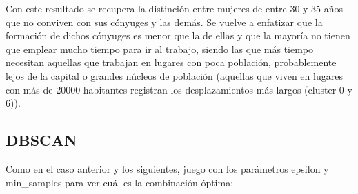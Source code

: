 Con este resultado se recupera la distinción entre mujeres de entre 30 y 35 años que no conviven con sus cónyuges y las demás. Se vuelve a enfatizar que la formación de dichos cónyuges es menor que la de ellas y que la mayoría no tienen que emplear mucho tiempo para ir al trabajo, siendo las que más tiempo necesitan aquellas que trabajan en lugares con poca población, probablemente lejos de la capital o grandes núcleos de población (aquellas que viven en lugares con más de 20000 habitantes registran los desplazamientos más largos (cluster 0 y 6)).

\newpage

\subsection{DBSCAN}

Como en el caso anterior y los siguientes, juego con los parámetros epsilon y min\_samples para ver cuál es la combinación óptima:

